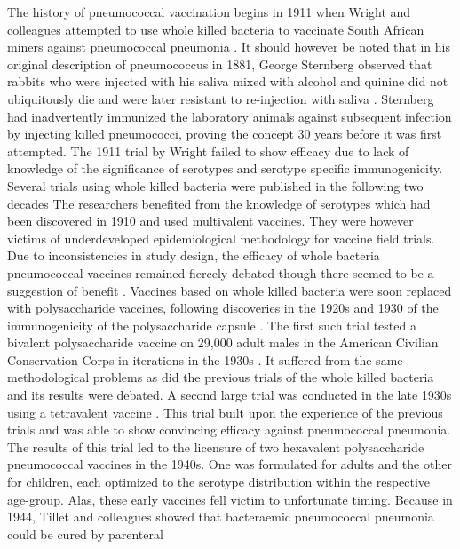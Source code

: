 \documentclass[]{book}
\theoremstyle{definition}
\theoremstyle{definition}
\theoremstyle{definition}
\theoremstyle{remark}
\begin{document}
The history of pneumococcal vaccination begins in 1911 when Wright and
colleagues attempted to use whole killed bacteria to vaccinate South
African miners against pneumococcal pneumonia \citep{Wright1914}. It
should however be noted that in his original description of pneumococcus
in 1881, George Sternberg observed that rabbits who were injected with
his saliva mixed with alcohol and quinine did not ubiquitously die and
were later resistant to re-injection with saliva
\citep[\citet{Sternberg1881}]{Austrian1999a}. Sternberg had
inadvertently immunized the laboratory animals against subsequent
infection by injecting killed pneumococci, proving the concept 30 years
before it was first attempted. The 1911 trial by Wright failed to show
efficacy due to lack of knowledge of the significance of serotypes and
serotype specific immunogenicity. Several trials using whole killed
bacteria were published in the following two decades
\citep{Cecil1918, Lister1916, Lister1936, Maynard1913} The researchers
benefited from the knowledge of serotypes which had been discovered in
1910 and used multivalent vaccines. They were however victims of
underdeveloped epidemiological methodology for vaccine field trials. Due
to inconsistencies in study design, the efficacy of whole bacteria
pneumococcal vaccines remained fiercely debated though there seemed to
be a suggestion of benefit \citep{Austrian1999a}. Vaccines based on
whole killed bacteria were soon replaced with polysaccharide vaccines,
following discoveries in the 1920s and 1930 of the immunogenicity of the
polysaccharide capsule
\citep{Dochez1917, Finland1931, Francis1930, Heidelberger1923, Schiemann1927}.
The first such trial tested a bivalent polysaccharide vaccine on 29,000
adult males in the American Civilian Conservation Corps in iterations in
the 1930s \citep{Ekwurzel1938}. It suffered from the same methodological
problems as did the previous trials of the whole killed bacteria and its
results were debated. A second large trial was conducted in the late
1930s using a tetravalent vaccine \citep{Macleod1945}. This trial built
upon the experience of the previous trials and was able to show
convincing efficacy against pneumococcal pneumonia. The results of this
trial led to the licensure of two hexavalent polysaccharide pneumococcal
vaccines in the 1940s. One was formulated for adults and the other for
children, each optimized to the serotype distribution within the
respective age-group. Alas, these early vaccines fell victim to
unfortunate timing. Because in 1944, Tillet and colleagues showed that
bacteraemic pneumococcal pneumonia could be cured by parenteral
\end{document}
